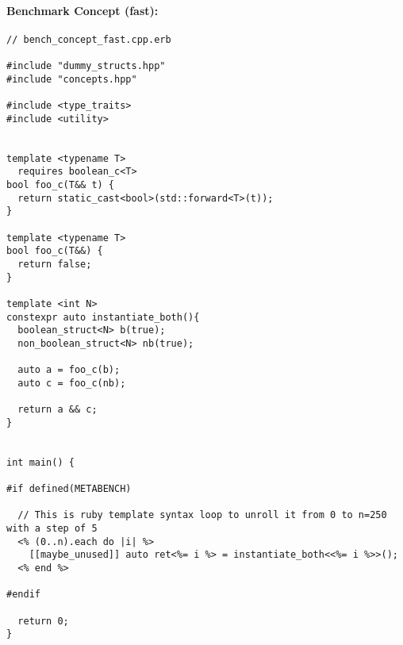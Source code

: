 \paragraph{Benchmark Concept (fast):}
\begin{verbatim}
// bench_concept_fast.cpp.erb

#include "dummy_structs.hpp"
#include "concepts.hpp"

#include <type_traits>
#include <utility>


template <typename T>
  requires boolean_c<T>
bool foo_c(T&& t) {
  return static_cast<bool>(std::forward<T>(t));
}

template <typename T>
bool foo_c(T&&) {
  return false;
}

template <int N>
constexpr auto instantiate_both(){
  boolean_struct<N> b(true);
  non_boolean_struct<N> nb(true);

  auto a = foo_c(b);
  auto c = foo_c(nb);

  return a && c;
}


int main() {

#if defined(METABENCH)

  // This is ruby template syntax loop to unroll it from 0 to n=250 with a step of 5
  <% (0..n).each do |i| %>
    [[maybe_unused]] auto ret<%= i %> = instantiate_both<<%= i %>>();
  <% end %>

#endif

  return 0;
}
\end{verbatim}
